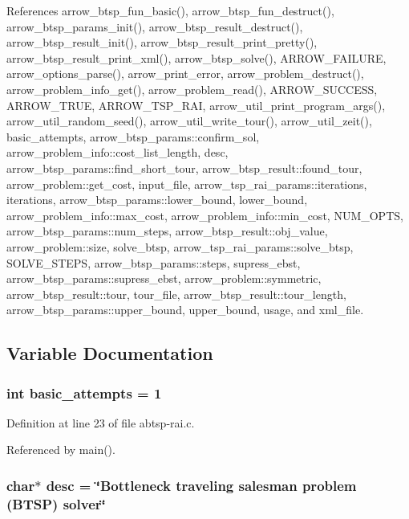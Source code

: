 References arrow\_\-btsp\_\-fun\_\-basic(), arrow\_\-btsp\_\-fun\_\-destruct(), arrow\_\-btsp\_\-params\_\-init(), arrow\_\-btsp\_\-result\_\-destruct(), arrow\_\-btsp\_\-result\_\-init(), arrow\_\-btsp\_\-result\_\-print\_\-pretty(), arrow\_\-btsp\_\-result\_\-print\_\-xml(), arrow\_\-btsp\_\-solve(), ARROW\_\-FAILURE, arrow\_\-options\_\-parse(), arrow\_\-print\_\-error, arrow\_\-problem\_\-destruct(), arrow\_\-problem\_\-info\_\-get(), arrow\_\-problem\_\-read(), ARROW\_\-SUCCESS, ARROW\_\-TRUE, ARROW\_\-TSP\_\-RAI, arrow\_\-util\_\-print\_\-program\_\-args(), arrow\_\-util\_\-random\_\-seed(), arrow\_\-util\_\-write\_\-tour(), arrow\_\-util\_\-zeit(), basic\_\-attempts, arrow\_\-btsp\_\-params::confirm\_\-sol, arrow\_\-problem\_\-info::cost\_\-list\_\-length, desc, arrow\_\-btsp\_\-params::find\_\-short\_\-tour, arrow\_\-btsp\_\-result::found\_\-tour, arrow\_\-problem::get\_\-cost, input\_\-file, arrow\_\-tsp\_\-rai\_\-params::iterations, iterations, arrow\_\-btsp\_\-params::lower\_\-bound, lower\_\-bound, arrow\_\-problem\_\-info::max\_\-cost, arrow\_\-problem\_\-info::min\_\-cost, NUM\_\-OPTS, arrow\_\-btsp\_\-params::num\_\-steps, arrow\_\-btsp\_\-result::obj\_\-value, arrow\_\-problem::size, solve\_\-btsp, arrow\_\-tsp\_\-rai\_\-params::solve\_\-btsp, SOLVE\_\-STEPS, arrow\_\-btsp\_\-params::steps, supress\_\-ebst, arrow\_\-btsp\_\-params::supress\_\-ebst, arrow\_\-problem::symmetric, arrow\_\-btsp\_\-result::tour, tour\_\-file, arrow\_\-btsp\_\-result::tour\_\-length, arrow\_\-btsp\_\-params::upper\_\-bound, upper\_\-bound, usage, and xml\_\-file.

\subsection{Variable Documentation}
\hypertarget{abtsp-rai_8c_227b7ec968925f365b96a92ace419c56}{
\subsubsection{\setlength{\rightskip}{0pt plus 5cm}int {\bf basic\_\-attempts} = 1}}
\label{abtsp-rai_8c_227b7ec968925f365b96a92ace419c56}




Definition at line 23 of file abtsp-rai.c.

Referenced by main().\hypertarget{abtsp-rai_8c_3aad16fd4bea1b9717f232ea75ad6449}{
\subsubsection{\setlength{\rightskip}{0pt plus 5cm}char$\ast$ {\bf desc} = \char`\"{}Bottleneck traveling salesman problem (BTSP) solver\char`\"{}}}
\label{abtsp-rai_8c_3aad16fd4bea1b9717f232ea75ad6449}




